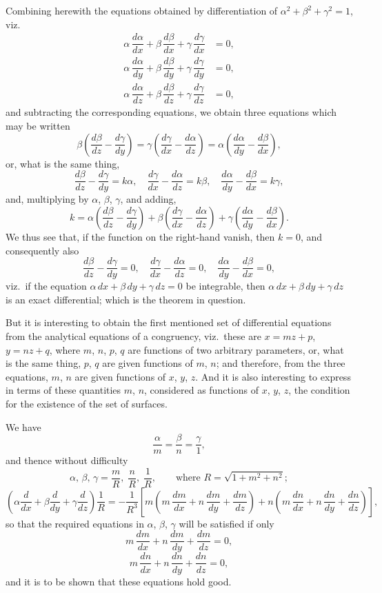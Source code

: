 \documentclass[11pt]{article}
\begin{document}
Combining herewith the equations obtained by differentiation of $\alpha^2 + \beta^2 + \gamma^2 = 1$, viz.
\begin{align*}
\alpha\,\dfrac{d\alpha}{dx} + \beta\,\dfrac{d\beta}{dx} + \gamma\,\dfrac{d\gamma}{dx} &= 0,\\
\alpha\,\dfrac{d\alpha}{dy} + \beta\,\dfrac{d\beta}{dy} + \gamma\,\dfrac{d\gamma}{dy} &= 0,\\
\alpha\,\dfrac{d\alpha}{dz} + \beta\,\dfrac{d\beta}{dz} + \gamma\,\dfrac{d\gamma}{dz} &= 0,
\end{align*}
and subtracting the corresponding equations, we obtain three equations which may be written
\[
\beta\!\left(\dfrac{d\beta}{dz} - \dfrac{d\gamma}{dy}\right) = \gamma\!\left(\dfrac{d\gamma}{dx} - \dfrac{d\alpha}{dz}\right) = \alpha\!\left(\dfrac{d\alpha}{dy} - \dfrac{d\beta}{dx}\right),
\]
or, what is the same thing,
\[
\dfrac{d\beta}{dz} - \dfrac{d\gamma}{dy} = k\alpha,\quad \dfrac{d\gamma}{dx} - \dfrac{d\alpha}{dz} = k\beta,\quad \dfrac{d\alpha}{dy} - \dfrac{d\beta}{dx} = k\gamma,
\]
and, multiplying by $\alpha$, $\beta$, $\gamma$, and adding,
\[
k = \alpha\!\left(\dfrac{d\beta}{dz} - \dfrac{d\gamma}{dy}\right) + \beta\!\left(\dfrac{d\gamma}{dx} - \dfrac{d\alpha}{dz}\right) + \gamma\!\left(\dfrac{d\alpha}{dy} - \dfrac{d\beta}{dx}\right).
\]
We thus see that, if the function on the right-hand vanish, then $k = 0$, and consequently also
\[
\dfrac{d\beta}{dz} - \dfrac{d\gamma}{dy} = 0,\quad \dfrac{d\gamma}{dx} - \dfrac{d\alpha}{dz} = 0,\quad \dfrac{d\alpha}{dy} - \dfrac{d\beta}{dx} = 0,
\]
viz.\ if the equation $\alpha\,dx + \beta\,dy + \gamma\,dz = 0$ be integrable, then $\alpha\,dx + \beta\,dy + \gamma\,dz$ is an exact differential; which is the theorem in question.

But it is interesting to obtain the first mentioned set of differential equations from the analytical equations of a congruency, viz.\ these are $x = mz + p$, $y = nz + q$, where $m$, $n$, $p$, $q$ are functions of two arbitrary parameters, or, what is the same thing, $p$, $q$ are given functions of $m$, $n$; and therefore, from the three equations, $m$, $n$ are given functions of $x$, $y$, $z$. And it is also interesting to express in terms of these quantities $m$, $n$, considered as functions of $x$, $y$, $z$, the condition for the existence of the set of surfaces.

We have
\[
\dfrac{\alpha}{m} = \dfrac{\beta}{n} = \dfrac{\gamma}{1},
\]
and thence without difficulty
\[
\alpha,\,\beta,\,\gamma = \dfrac{m}{R},\;\dfrac{n}{R},\;\dfrac{1}{R},\qquad\text{where } R = \sqrt{1 + m^2 + n^2};
\]
\[
\left(\alpha\dfrac{d}{dx} + \beta\dfrac{d}{dy} + \gamma\dfrac{d}{dz}\right)\!\dfrac{1}{R} = -\dfrac{1}{R^3}\!\left[m\!\left(m\,\dfrac{dm}{dx} + n\,\dfrac{dm}{dy} + \dfrac{dm}{dz}\right) + n\!\left(m\,\dfrac{dn}{dx} + n\,\dfrac{dn}{dy} + \dfrac{dn}{dz}\right)\right],
\]
so that the required equations in $\alpha$, $\beta$, $\gamma$ will be satisfied if only
\[
m\,\dfrac{dm}{dx} + n\,\dfrac{dm}{dy} + \dfrac{dm}{dz} = 0,
\]
\[
m\,\dfrac{dn}{dx} + n\,\dfrac{dn}{dy} + \dfrac{dn}{dz} = 0,
\]
and it is to be shown that these equations hold good.
\end{document}
